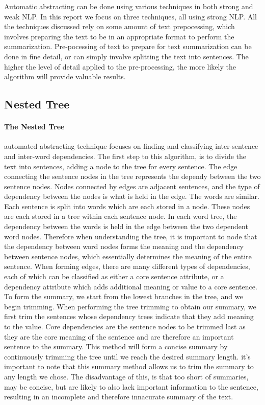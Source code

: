 
Automatic abstracting can be done using various techniques in both strong and weak NLP. In this report we focus on three techniques, all using strong NLP. All the techniques discussed rely on some amount of text prepocessing, which involves preparing the text to be in an appropriate format to perform the summarization. Pre-pocessing of text to prepare for text summarization can be done in fine detail, or can simply involve splitting the text into sentences. The higher the level of detail applied to the pre-processing, the more likely the algorithm will provide valuable results.


\subsection{Nested Tree}

	\paragraph{The Nested Tree} automated abstracting technique focuses on finding and classifying inter-sentence and inter-word dependencies. The first step to this algorithm, is to divide the text into sentences, adding a node to the tree for every sentence. The edge connecting the sentence nodes in the tree represents the dependy between the two sentence nodes. Nodes connected by edges are adjacent sentences, and the type of dependency between the nodes is what is held in the edge. The words are similar. Each sentence is split into words which are each stored in a node. These nodes are each stored in a tree within each sentence node. In each word tree, the dependency between the words is held in the edge between the two dependent word nodes. Therefore when understanding the tree, it is important to node that the dependency between word nodes forms the meaning and the dependency between sentence nodes, which essentially determines the meaning of the entire sentence. When forming edges, there are many different types of dependencies, each of which can be classified as either a core sentence attribute, or a dependency attribute which adds additional meaning or value to a core sentence. To form the summary, we start from the lowest branches in the tree, and we begin trimming. When performing the tree trimming to obtain our summary, we first trim the sentences whose dependency trees indicate that they add meaning to the value. Core dependencies are the sentence nodes to be trimmed last as they are the core meaning of the sentence and are therefore an important sentence to the summary. This method will form a concise summary by continuously trimming the tree until we reach the desired summary length. it's important to note that this summary method allows us to trim the summary to any length we chose. The disadvantage of this, is that too short of summaries, may be concise, but are likely to also lack important information to the sentence, resulting in an incomplete and therefore innacurate summary of the text. 


